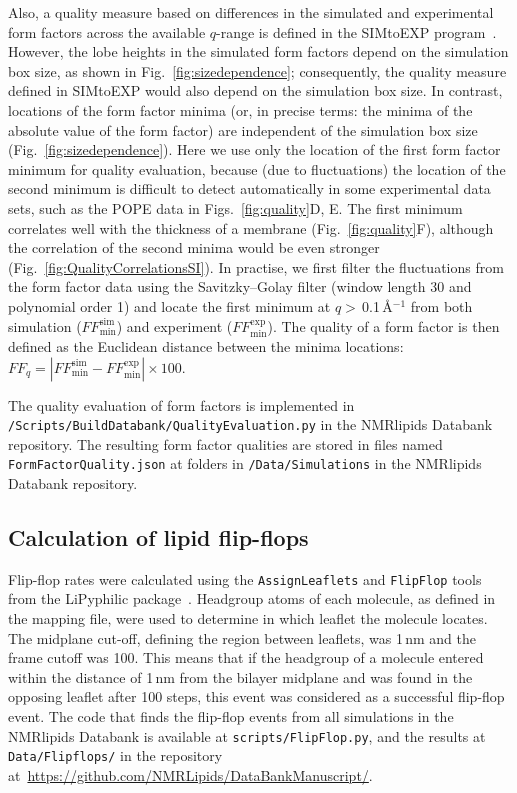 \documentclass[fleqn,10pt]{wlscirep}
\begin{document}
Also, a quality measure based on differences in the simulated and experimental form factors across the available $q$-range is defined in the SIMtoEXP program~\cite{kucerka10}. However, the lobe heights in the simulated form factors depend on the simulation box size, as shown in Fig.~\ref{fig:sizedependence}; consequently, the quality measure defined in SIMtoEXP  would also depend on the simulation box size. In contrast, locations of the form factor minima (or, in precise terms: the minima of the absolute value of the form factor) are independent of the simulation box size (Fig.~\ref{fig:sizedependence}).
Here we use only the location of the first form factor minimum for quality evaluation,
because (due to fluctuations) the location of the second minimum is difficult to detect automatically in some experimental data sets, such as the POPE data in Figs.~\ref{fig:quality}D, E.
The first minimum correlates well with the thickness of a membrane (Fig.~\ref{fig:quality}F), although the correlation of the second minima would be even stronger (Fig.~\ref{fig:QualityCorrelationsSI}).
In practise, we first filter the fluctuations from the form factor data using the Savitzky--Golay filter (window length 30 and polynomial order 1) and locate the first minimum at  $q>$\,0.1\,\AA$^{-1}$ from both simulation ($F\!F_\mathrm{min}^\mathrm{sim}$) and experiment ($F\!F_\mathrm{min}^\mathrm{exp}$).
The quality of a form factor is then defined as the Euclidean distance between the minima locations: $F\!F_q = |F\!F_\mathrm{min}^\mathrm{sim}-F\!F_\mathrm{min}^\mathrm{exp}| \times 100$. 

The quality evaluation of form factors is implemented in \texttt{/Scripts/BuildDatabank/QualityEvaluation.py} in the NMRlipids Databank repository. The resulting form factor qualities are stored in files named \texttt{FormFactorQuality.json} at folders in \texttt{/Data/Simulations} in the NMRlipids Databank repository.


\subsection{Calculation of lipid flip-flops}
Flip-flop rates were calculated using the \texttt{AssignLeaflets} and \texttt{FlipFlop} tools from the LiPyphilic package~\cite{LiPyphilic2021}.
Headgroup atoms of each molecule, as defined in the mapping file, were used to determine in which leaflet the molecule locates. The midplane cut-off, defining the region between leaflets, was 1\,nm and the frame cutoff was 100. This means that if the headgroup of a molecule entered within the distance of 1\,nm from the bilayer midplane and was found in the opposing leaflet after 100 steps, this event was considered as a successful flip-flop event. The code that finds the flip-flop events from all simulations in the NMRlipids Databank is available at \texttt{scripts/FlipFlop.py}, and the results at \texttt{Data/Flipflops/} in the repository at~\url{https://github.com/NMRLipids/DataBankManuscript/}. 
\end{document}
